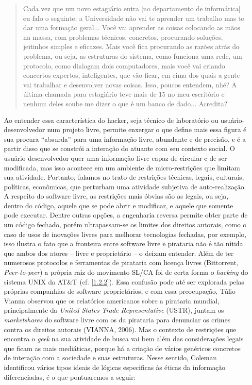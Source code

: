 \begin{quote}
Cada vez que um novo estagiário entra [no departamento de informática] eu falo o seguinte: a Universidade não vai te aprender um trabalho mas te dar uma formação geral... Você vai aprender as coisas colocando as mãos na massa, com problemas técnicos, concretos, procurando soluções, jeitinhos simples e eficazes. Mais você fica procurando as razões atrás do problema, ou seja, as estruturas do sistema, como funciona uma rede, um protocolo, como dialogam dois computadores, mais você vai criando concertos expertos, inteligentes, que vão ficar, em cima dos quais a gente vai trabalhar e desenvolver novas coisas. Isso, poucos entendem, nhé? A última chamada para estagiário teve mais de 15 no meu escritório e nenhum deles soube me dizer o que é um banco de dado... Acredita?
\end{quote}

Ao entender essa característica do hacker, seja técnico de laboratório ou usuário-desenvolvedor num projeto livre, permite enxergar o que define mais essa figura é sua procura “absurda” para uma informação livre, abundante e de precisão, e é a partir disso que se constrói a interação do atuante com seu contexto social. O usuário-desenvolvedor quer uma informação livre capaz de circular e de ser modificada, mas isso acontece em um ambiente de micro-restrições que limitam sua atividade. Portanto, falamos no trato de restrições técnicas, legais, culturais, políticas, econômicas, que perturbam uma atividade subjetiva de auto-realização. A respeito do software livre, as restrições mais óbvias são as legais, ou seja, dentro do código, aquele que se pode abrir e modificar, e aquele que somente pode executar. Dentre outras opções, a engenharia reversa permite obter parte de um código fechado, porém ultrapassam-se os limites dos direitos autorais, como o caso de usos de inovações livres para melhorar tecnologias fechadas, por exemplo, isso ilustra o fato que a fronteira entre software livre e pirataria não é tão nítida que ambos dos atores – livre e proprietário – o deixam entender. Além de ter numerosos protocolos e ferramentas de pirataria com licença livres (Bittorrent, \emph{Peer-to-peer}) a própria raiz do movimento SL/CA foi de certa forma o \emph{hacking} do sistema UNIX da AT\&T (cf. \ref{1.2.2}). Essa confusão pode até ser explorada pelas próprias companhias de software proprietários, e com essa preocupação, Túlio Vianna observou que os relatórios americanos sobre a pirataria mundial, principalmente da \emph{United States Trade Representative} (USTR), juntam os \emph{marketshares} do software livre com os da pirataria para denunciar os crimes contra os direitos autorais (VIANNA, 2006). Mas o contexto de restrições que encontra o \emph{geek} na sua atividade de busca vai bem além das considerações legais que ficam as mais mediáticas, porque há a criação de vários genéricos concretos de interação com a sociedade e suas estruturas. Nesse sentido, Coleman identificou vários tipos ideais de lógicas especificas às éticas da informação diferenciadas, é o que pontuaremos a seguir:


